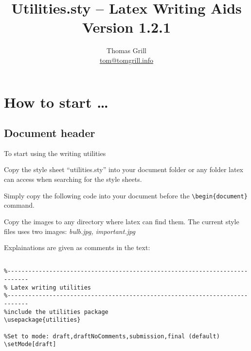 \documentclass[a4paper,12pt]{article}
\title{Utilities.sty -- Latex Writing Aids\\ \bigskip \small Version 1.2.1}
\author{Thomas Grill\\ \url{tom@tomgrill.info}}
\begin{document}


\maketitle


\section{How to start \ldots}

\subsection{Document header}


To start using the writing utilities 


\begin{compactenum}
\item Copy the style sheet ``utilities.sty'' into your document folder or any folder latex can access when searching for the style sheets.
\item Simply copy the following code into your document before the \verb+\begin{document}+ command. 

\item Copy the images to any directory where latex can find them. The current style files uses two images: \emph{bulb.jpg, important.jpg}
\end{compactenum}

Explainations are given as comments in the text:


\begin{verbatim}

%----------------------------------------------------------------------------
% Latex writing utilities
%----------------------------------------------------------------------------
%include the utilities package
\usepackage{utilities}  

%Set to mode: draft,draftNoComments,submission,final (default)
\setMode[draft]

\end{verbatim}
\end{document}
